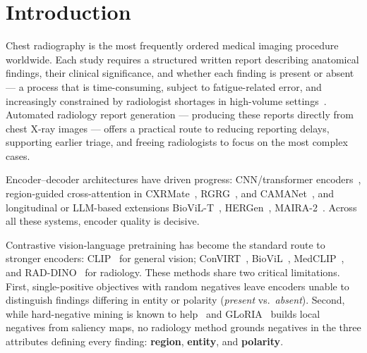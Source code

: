 \documentclass[runningheads]{llncs}
\begin{document}

\section{Introduction}
\label{sec:intro}

Chest radiography is the most frequently ordered medical imaging
procedure worldwide.
Each study requires a structured written report describing anatomical
findings, their clinical significance, and whether each finding is
present or absent --- a process that is time-consuming, subject to
fatigue-related error, and increasingly constrained by radiologist
shortages in high-volume settings~\cite{mimiccxr}.
Automated radiology report generation --- producing these reports
directly from chest X-ray images --- offers a practical route to
reducing reporting delays, supporting earlier triage, and freeing
radiologists to focus on the most complex cases.

Encoder--decoder architectures have driven progress: CNN/transformer
encoders~\cite{r2gen,cmn}, region-guided cross-attention in
CXRMate~\cite{cxrmate}, RGRG~\cite{rgrg}, and
CAMANet~\cite{camanet}, and longitudinal or LLM-based extensions
BioViL-T~\cite{biovilt}, HERGen~\cite{hergen}, MAIRA-2~\cite{maira2}.
Across all these systems, encoder quality is decisive.

Contrastive vision-language pretraining has become the standard route
to stronger encoders: CLIP~\cite{clip} for general vision;
ConVIRT~\cite{convirt}, BioViL~\cite{biovil}, MedCLIP~\cite{medclip},
and RAD-DINO~\cite{raddino} for radiology.
These methods share two critical limitations.
First, single-positive objectives with random negatives leave encoders
unable to distinguish findings differing in entity or polarity
(\textit{present} vs.\ \textit{absent}).
Second, while hard-negative mining is known to help~\cite{hardmining}
and GLoRIA~\cite{gloria} builds local negatives from saliency maps,
no radiology method grounds negatives in the three attributes defining
every finding: \textbf{region}, \textbf{entity}, and \textbf{polarity}.
\end{document}
